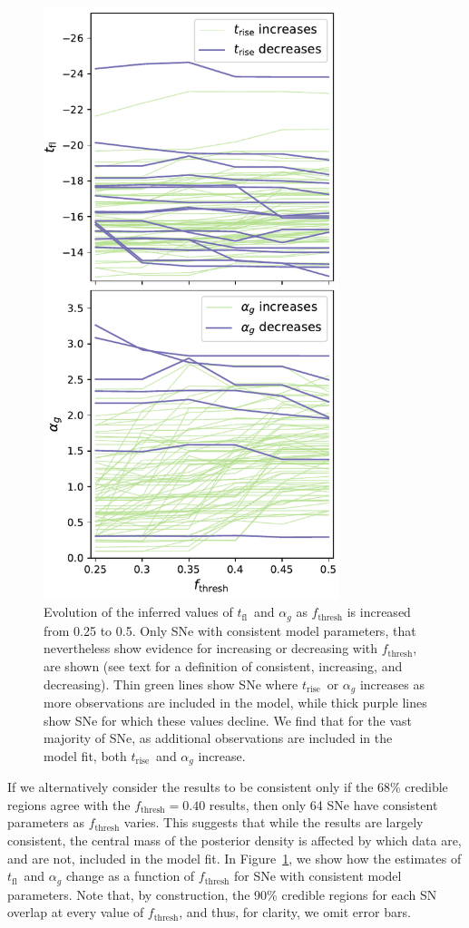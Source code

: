 \documentclass[twocolumn]{./aastex63}
\newcommand{\tfl}{$t_\mathrm{fl}$}
\newcommand{\trise}{$t_\mathrm{rise}$}
\begin{document}
\begin{figure}
    \centering
    \includegraphics[width=3.4in]{./figures/flux_frac.pdf}
    \caption{Evolution of the inferred values of \tfl\ and $\alpha_g$ as
    $f_\mathrm{thresh}$ is increased from 0.25 to 0.5. Only SNe with consistent
    model parameters, that nevertheless show evidence for increasing or
    decreasing with $f_\mathrm{thresh}$, are shown (see text for a definition of
    consistent, increasing, and decreasing). Thin green lines show SNe where
    \trise\ or $\alpha_g$ increases as more observations are included in the
    model, while thick purple lines show SNe for which these values decline. We
    find that for the vast majority of SNe, as additional observations are
    included in the model fit, both \trise\ and $\alpha_g$ increase.}
    \label{fig:flux_frac}
\end{figure}

If we alternatively consider the results to be consistent only if the 68\%
credible regions agree with the $f_\mathrm{thresh} = 0.40$ results, then only 64
SNe have consistent parameters as $f_\mathrm{thresh}$ varies. This suggests that
while the results are largely consistent, the central mass of the posterior
density is affected by which data are, and are not, included in the model fit.
In Figure~\ref{fig:flux_frac}, we show how the estimates of \tfl\ and $\alpha_g$
change as a function of $f_\mathrm{thresh}$ for SNe with consistent model
parameters. Note that, by construction, the 90\% credible regions for each SN
overlap at every value of $f_\mathrm{thresh}$, and thus, for clarity, we omit
error bars.
\end{document}
